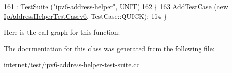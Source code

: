 \begin{DoxyCode}
161   : \hyperlink{classns3_1_1TestSuite_a904b0c40583b744d30908aeb94636d1a}{TestSuite} (\textcolor{stringliteral}{"ipv6-address-helper"}, \hyperlink{classns3_1_1TestSuite_a1ebfcab34ec8161e085e8e3a1855eae0a3885375a3787abf60431f8454b3cadbd}{UNIT})
162 \{
163   \hyperlink{classns3_1_1TestCase_a3718088e3eefd5d6454569d2e0ddd835}{AddTestCase} (\textcolor{keyword}{new} \hyperlink{classIpAddressHelperTestCasev6}{IpAddressHelperTestCasev6}, TestCase::QUICK);
164 \}
\end{DoxyCode}


Here is the call graph for this function\+:




The documentation for this class was generated from the following file\+:\begin{DoxyCompactItemize}
\item 
internet/test/\hyperlink{ipv6-address-helper-test-suite_8cc}{ipv6-\/address-\/helper-\/test-\/suite.\+cc}\end{DoxyCompactItemize}
